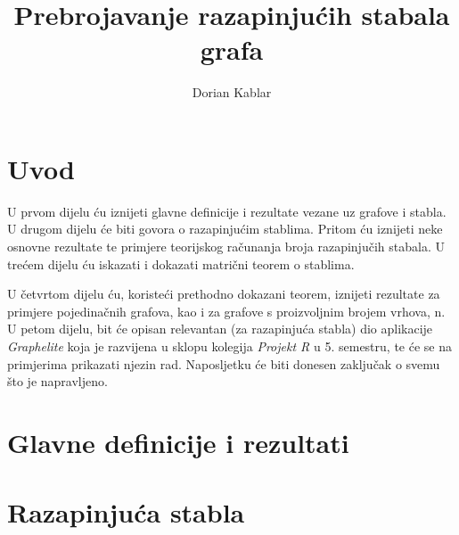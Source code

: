 \documentclass[times, utf8, zavrsni]{fer}
\begin{document}

\title{Prebrojavanje razapinjućih stabala grafa}

\author{Dorian Kablar}

\maketitle



\tableofcontents

\chapter{Uvod}
U prvom dijelu ću iznijeti glavne definicije i rezultate vezane uz grafove i stabla. U drugom dijelu će biti govora o razapinjućim stablima. Pritom ću iznijeti neke osnovne rezultate te primjere teorijskog računanja broja razapinjučih stabala. 
U trećem dijelu ću iskazati i dokazati matrični teorem o stablima. 

U četvrtom dijelu ću, koristeći prethodno dokazani teorem, iznijeti rezultate za primjere pojedinačnih grafova, kao i za grafove s proizvoljnim brojem vrhova, n. U petom dijelu, bit će opisan relevantan (za razapinjuća stabla) dio aplikacije \textit{Graphelite} koja je razvijena u sklopu kolegija \textit{Projekt R} u 5. semestru, te će se na primjerima prikazati njezin rad. Naposljetku će biti donesen zaključak o svemu što je napravljeno.

\chapter{Glavne definicije i rezultati}

\chapter{Razapinjuća stabla}
\end{document}
